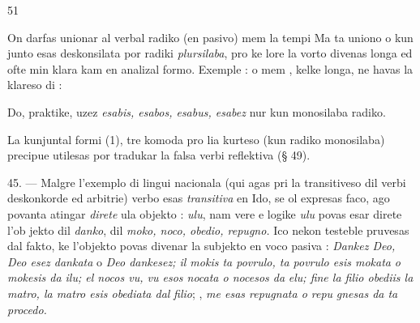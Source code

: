 \begin{VUpage}[55]{51}

On darfas unionar al verbal radiko (en pasivo) mem la\nl
tempi  Ma ta uniono o kun\cc
junto esas deskonsilata por radiki \textit{plursilaba}, pro ke lore la\nl
vorto divenas longa ed ofte min klara kam en analizal formo.\nl
Exemple :  o mem , kelke\nl
longa, ne havas la klareso di : \nl
{}

Do, praktike, uzez \textit{esabis, esabos, esabus, esabez} nur kun\nl
monosilaba radiko.

La kunjuntal formi (1), tre komoda pro lia kurteso (kun\nl
radiko monosilaba) precipue utilesas por tradukar la falsa\nl
verbi reflektiva (§ 49).

\VUblanc{5.62pt}%
45. --- Malgre l'exemplo di lingui nacionala (qui agas\nl
pri la transitiveso dil verbi deskonkorde ed arbitrie) verbo\nl
esas \textit{transitiva} en Ido, se ol expresas faco, ago povanta\nl
atingar \textit{direte} ula objekto : \nl
{} \textit{ulu}, nam vere e logike \textit{ulu} povas esar direte l'ob\cc
jekto dil \textit{danko}, dil \textit{moko, noco, obedio, repugno.} Ico nekon\cc
testeble pruvesas dal fakto, ke l'objekto povas divenar la\nl
subjekto en voco pasiva : \textit{Dankez Deo, Deo esez dankata} o\nl
\textit{Deo dankesez; il mokis ta povrulo, ta povrulo esis mokata}\nl
\textit{o mokesis da ilu; el nocos vu, vu esos nocata o nocesos da}\nl
\textit{elu; fine la filio obediis la matro, la matro esis obediata dal}\nl
\textit{filio}; , \textit{me esas repugnata o repu}\cc
\textit{gnesas da ta procedo.}


\end{VUpage}
